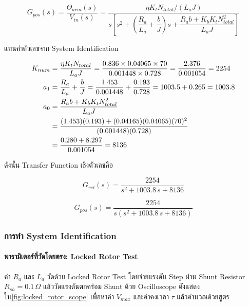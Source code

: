 \begin{equation}
  G_{pos}(s) = \frac{\Theta_{arm}(s)}{V_{in}(s)}
             = \frac{\eta K_t N_{total} / (L_a J)}
                    {s\left[s^2 + \left(\dfrac{R_a}{L_a} + \dfrac{b}{J}\right)s
                         + \dfrac{R_a b + K_b K_t N_{total}^2}{L_a J}\right]}
  \label{eq:Gpos}
\end{equation}

แทนค่าตัวเลขจาก System Identification

\begin{align}
  K_{num} &= \frac{\eta K_t N_{total}}{L_a J}
           = \frac{0.836 \times 0.04065 \times 70}{0.001448 \times 0.728}
           = \frac{2.376}{0.001054} = 2254 \notag \\
  a_1     &= \frac{R_a}{L_a} + \frac{b}{J}
           = \frac{1.453}{0.001448} + \frac{0.193}{0.728}
           = 1003.5 + 0.265 = 1003.8 \notag \\
  a_0     &= \frac{R_a b + K_b K_t N_{total}^2}{L_a J} \notag \\
           &= \frac{(1.453)(0.193) + (0.04165)(0.04065)(70)^2}{(0.001448)(0.728)} \notag \\
           &= \frac{0.280 + 8.297}{0.001054} = 8136 \notag
\end{align}

ดังนั้น Transfer Function เชิงตัวเลขคือ

\begin{equation}
  G_{vel}(s) = \frac{2254}{s^2 + 1003.8\,s + 8136}
  \label{eq:Gvel_num}
\end{equation}

\begin{equation}
  G_{pos}(s) = \frac{2254}{s\left(s^2 + 1003.8\,s + 8136\right)}
  \label{eq:Gpos_num}
\end{equation}

\subsubsection{การทำ System Identification}
\label{subsubsec:system_identification}

\paragraph{พารามิเตอร์ที่วัดโดยตรง: Locked Rotor Test}

ค่า $R_a$ และ $L_a$ วัดด้วย Locked Rotor Test โดยจ่ายแรงดัน Step
ผ่าน Shunt Resistor $R_{sh} = 0.1\,\Omega$ แล้ววัดแรงดันตกคร่อม Shunt
ด้วย Oscilloscope ดังแสดงใน\cref{fig:locked_rotor_scope}
เพื่อหาค่า $V_{max}$ และค่าคงเวลา $\tau$ แล้วคำนวณด้วยสูตร


